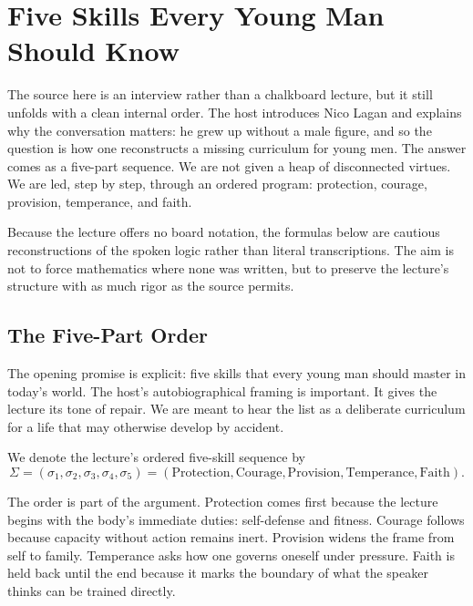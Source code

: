 \chapter{Five Skills Every Young Man Should Know}

The source here is an interview rather than a chalkboard lecture, but it still unfolds with a clean internal order. The host introduces Nico Lagan and explains why the conversation matters: he grew up without a male figure, and so the question is how one reconstructs a missing curriculum for young men. The answer comes as a five-part sequence. We are not given a heap of disconnected virtues. We are led, step by step, through an ordered program: protection, courage, provision, temperance, and faith.

Because the lecture offers no board notation, the formulas below are cautious reconstructions of the spoken logic rather than literal transcriptions. The aim is not to force mathematics where none was written, but to preserve the lecture's structure with as much rigor as the source permits.

\section{The Five-Part Order}

The opening promise is explicit: five skills that every young man should master in today's world. The host's autobiographical framing is important. It gives the lecture its tone of repair. We are meant to hear the list as a deliberate curriculum for a life that may otherwise develop by accident.

\begin{definition}
We denote the lecture's ordered five-skill sequence by
\begin{equation}
\Sigma=(\sigma_1,\sigma_2,\sigma_3,\sigma_4,\sigma_5)
=(\mathrm{Protection},\mathrm{Courage},\mathrm{Provision},\mathrm{Temperance},\mathrm{Faith}).
\end{equation}
\end{definition}

The order is part of the argument. Protection comes first because the lecture begins with the body's immediate duties: self-defense and fitness. Courage follows because capacity without action remains inert. Provision widens the frame from self to family. Temperance asks how one governs oneself under pressure. Faith is held back until the end because it marks the boundary of what the speaker thinks can be trained directly.

